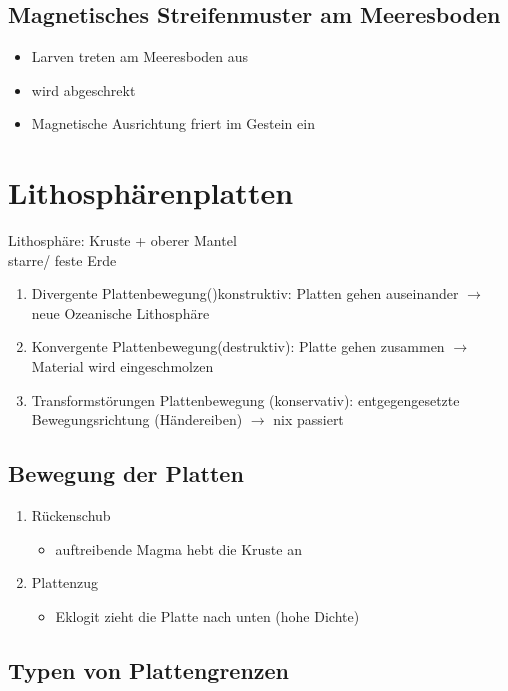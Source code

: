 \documentclass[a4,12pt]{scrreprt}
\begin{document}
\subsection{Magnetisches Streifenmuster am Meeresboden}
\begin{itemize}
\item Larven treten am Meeresboden aus
\item wird abgeschrekt
\item Magnetische Ausrichtung friert im Gestein ein
\end{itemize}

\section{Lithosphärenplatten}
Lithosphäre: Kruste + oberer Mantel\\
starre/ feste Erde\\
\begin{enumerate}
\item Divergente Plattenbewegung()konstruktiv: Platten gehen auseinander $\rightarrow$ neue Ozeanische Lithosphäre\\
\item Konvergente Plattenbewegung(destruktiv): Platte gehen zusammen $\rightarrow$ Material wird eingeschmolzen\\
\item Transformstörungen Plattenbewegung (konservativ): entgegengesetzte Bewegungsrichtung (Händereiben) $\rightarrow$ nix passiert\\
\end{enumerate}

\subsection{Bewegung der Platten}
\begin{enumerate}
\item Rückenschub
\begin{itemize}
\item auftreibende Magma hebt die Kruste an
\end{itemize}
\item Plattenzug
\begin{itemize}
\item Eklogit zieht die Platte nach unten (hohe Dichte)
\end{itemize}
\end{enumerate}

\subsection{Typen von Plattengrenzen}
\end{document}
